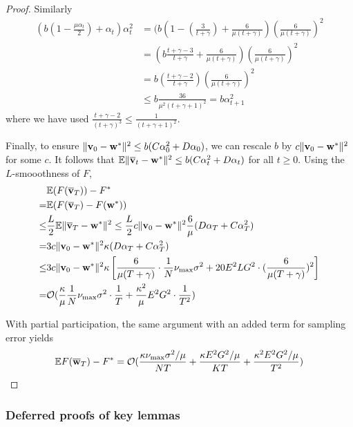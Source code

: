 \begin{proof}
Similarly 
\begin{align*}
(b(1-\frac{\mu\alpha_{t}}{2})+\alpha_{t})\alpha_{t}^{2} & =(b(1-(\frac{3}{t+\gamma})+\frac{6}{\mu(t+\gamma)})(\frac{6}{\mu(t+\gamma)})^{2}\\
& =(b\frac{t+\gamma-3}{t+\gamma}+\frac{6}{\mu(t+\gamma)})(\frac{6}{\mu(t+\gamma)})^{2}\\
& =b(\frac{t+\gamma-2}{t+\gamma})(\frac{6}{\mu(t+\gamma)})^{2}\\
& \leq b\frac{36}{\mu^{2}(t+\gamma+1)^{2}}=b\alpha_{t+1}^{2}
\end{align*}
where we have used $\frac{t+\gamma-2}{(t+\gamma)^{3}}\leq\frac{1}{(t+\gamma+1)^{2}}$.

Finally, to ensure $\|{\mathbf{v}}_{0}-{\mathbf{w}}^{\ast}\|^{2}\leq b(C\alpha_{0}^{2}+D\alpha_{0})$,
we can rescale $b$ by $c\|{\mathbf{v}}_{0}-{\mathbf{w}}^{\ast}\|^{2}$ for some $c.$ It
follows that $\mathbb{E}\|{\overline{\mathbf{v}}}_{t}-{\mathbf{w}}^{\ast}\|^{2}\leq b(C\alpha_{t}^{2}+D\alpha_{t})$
for all $t\geq0$. Using the $L$-smooothness of $F$,
\begin{align*}
&\mathbb{E}(F({\overline{\mathbf{v}}}_{T}))-F^{\ast} \\
=&\mathbb{E}(F({\overline{\mathbf{v}}}_{T})-F({\mathbf{w}}^{\ast}))\\
\leq & \frac{L}{2}\mathbb{E}\|{\overline{\mathbf{v}}}_{T}-{\mathbf{w}}^{\ast}\|^{2}\leq\frac{L}{2}c\|{\mathbf{v}}_{0}-{\mathbf{w}}^{\ast}\|^{2}\frac{6}{\mu}(D\alpha_{T}+C\alpha_{T}^{2})\\
= & 3c\|{\mathbf{v}}_{0}-{\mathbf{w}}^{\ast}\|^{2}\kappa(D\alpha_{T}+C\alpha_{T}^{2})\\
\leq &3c\|{\mathbf{v}}_{0}-{\mathbf{w}}^{\ast}\|^{2}\kappa\left[\frac{6}{\mu(T+\gamma)}\cdot\frac{1}{N}\nu_{\max}\sigma^{2}+20E^{2}LG^{2}\cdot(\frac{6}{\mu(T+\gamma)})^{2}\right]\\
 =&\mathcal{O}(\frac{\kappa}{\mu}\frac{1}{N}\nu_{\max}\sigma^{2}\cdot\frac{1}{T}+\frac{\kappa^{2}}{\mu}E^{2}G^{2}\cdot\frac{1}{T^{2}})
\end{align*}

With partial participation, the same argument with an added term for sampling error yields
\begin{align*}
\mathbb{E}F({\overline{\mathbf{w}}}_{T})-F^{\ast}=\mathcal{O}(\frac{\kappa\nu_{\max}\sigma^{2}/\mu}{NT}+\frac{\kappa E^{2}G^{2}/\mu}{KT}+\frac{\kappa^{2}E^{2}G^{2}/\mu}{T^{2}})
\end{align*}
\end{proof}

\subsubsection{Deferred proofs of key lemmas}

